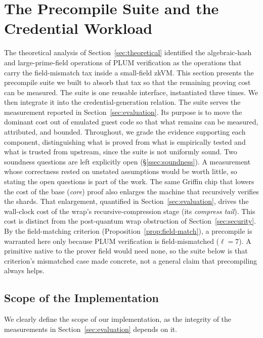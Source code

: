 \section{The Precompile Suite and the Credential Workload}\label{sec:system}
The theoretical analysis of Section~\ref{sec:theoretical} identified the algebraic-hash and large-prime-field operations of PLUM verification as the operations that carry the field-mismatch tax inside a small-field zkVM. This section presents the precompile suite we built to absorb that tax so that the remaining proving cost can be measured. The suite is one reusable interface, instantiated three times. We then integrate it into the credential-generation relation. The suite serves the measurement reported in Section~\ref{sec:evaluation}. Its purpose is to move the dominant cost out of emulated guest code so that what remains can be measured, attributed, and bounded. Throughout, we grade the evidence supporting each component, distinguishing what is proved from what is empirically tested and what is trusted from upstream, since the suite is not uniformly sound. Two soundness questions are left explicitly open (\S\ref{ssec:soundness}). A measurement whose correctness rested on unstated assumptions would be worth little, so stating the open questions is part of the work. The same Griffin chip that lowers the cost of the base (\emph{core}) proof also enlarges the machine that recursively verifies the shards. That enlargement, quantified in Section~\ref{sec:evaluation}, drives the wall-clock cost of the wrap's recursive-compression stage (its \emph{compress tail}). This cost is distinct from the post-quantum wrap obstruction of Section~\ref{sec:security}. By the field-matching criterion (Proposition~\ref{prop:field-match}), a precompile is warranted here only because PLUM verification is field-mismatched ($\ell=7$). A primitive native to the prover field would need none, so the suite below is that criterion's mismatched case made concrete, not a general claim that precompiling always helps.

\subsection{Scope of the Implementation}\label{ssec:impl-scope}
We clearly define the scope of our implementation, as the integrity of the measurements in Section~\ref{sec:evaluation} depends on it.


